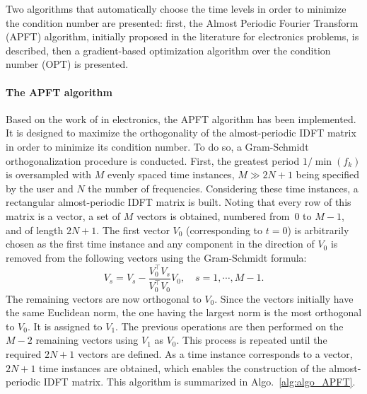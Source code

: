 
Two algorithms that automatically choose the time levels in order to
minimize the condition number are presented: first, the Almost
Periodic Fourier Transform (APFT) algorithm, initially proposed in the
 literature for electronics problems, is described, then a gradient-based
optimization algorithm over the condition number (OPT) is presented.

\paragraph{The APFT algorithm}
\label{sec:apft_algorithm}

Based on the work of \citet{Kundert1988} in
electronics, the APFT algorithm has been implemented. It is designed
to maximize the orthogonality of the almost-periodic
IDFT matrix in order to minimize its condition number. To do so, a
Gram-Schmidt orthogonalization procedure is conducted.  First, the greatest
period $1/\min(f_k)$ is oversampled with $M$ evenly spaced time
instances, $M\gg2N+1$ being specified by the user and $N$ the number of
frequencies. Considering these time instances, a rectangular
almost-periodic IDFT matrix is built. Noting that every row of this
matrix is a vector, a set of $M$ vectors is obtained, numbered from~0
to $M-1$, and of length $2N+1$. The first vector $V_0$ (corresponding
to $t=0$) is arbitrarily chosen as the first time instance and any
component in the direction of $V_0$ is removed from the following
vectors using the Gram-Schmidt formula:
\begin{equation}
   V_s = V_s - \frac{V_0^\top V_s}{V_0^\top V_0} V_0, \quad s=1,\cdots,M-1.
   \label{GramSchmidtAlgo}
\end{equation}
The remaining vectors are now orthogonal to $V_0$.  Since the vectors 
initially have the same Euclidean norm, the one having the largest
norm is the most orthogonal to $V_0$.  It is assigned to $V_1$. The previous
operations are then performed on the $M-2$ remaining vectors using $V_1$
as $V_0$. This process is repeated until the required $2N+1$ vectors
are defined. As a time instance corresponds to a vector, $2N+1$ time instances are obtained, 
which enables the construction of the almost-periodic
IDFT matrix. This algorithm is summarized in
Algo.~\ref{alg:algo_APFT}.

